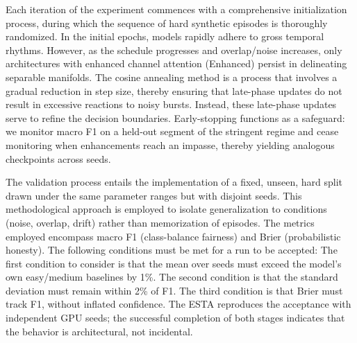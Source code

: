 \documentclass[journal]{IEEEtran}
\begin{document}
Each iteration of the experiment commences with a comprehensive initialization process, during which the sequence of hard synthetic episodes is thoroughly randomized. In the initial epochs, models rapidly adhere to gross temporal rhythms. However, as the schedule progresses and overlap/noise increases, only architectures with enhanced channel attention (Enhanced) persist in delineating separable manifolds. The cosine annealing method is a process that involves a gradual reduction in step size, thereby ensuring that late-phase updates do not result in excessive reactions to noisy bursts. Instead, these late-phase updates serve to refine the decision boundaries. Early-stopping functions as a safeguard: we monitor macro F1 on a held-out segment of the stringent regime and cease monitoring when enhancements reach an impasse, thereby yielding analogous checkpoints across seeds.

The validation process entails the implementation of a fixed, unseen, hard split drawn under the same parameter ranges but with disjoint seeds. This methodological approach is employed to isolate generalization to conditions (noise, overlap, drift) rather than memorization of episodes. The metrics employed encompass macro F1 (class-balance fairness) and Brier (probabilistic honesty). The following conditions must be met for a run to be accepted: The first condition to consider is that the mean over seeds must exceed the model's own easy/medium baselines by 1\%. The second condition is that the standard deviation must remain within 2\% of F1. The third condition is that Brier must track F1, without inflated confidence. The ESTA reproduces the acceptance with independent GPU seeds; the successful completion of both stages indicates that the behavior is architectural, not incidental.
\end{document}
